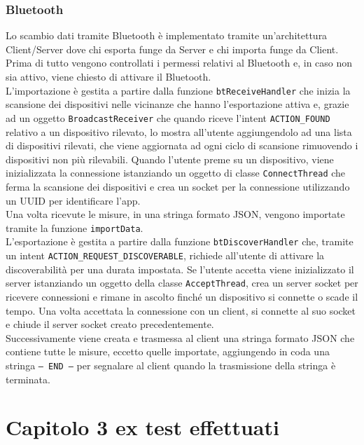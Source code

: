 \documentclass[11pt]{article}
\begin{document}
\subsubsection{Bluetooth}
Lo scambio dati tramite Bluetooth è implementato tramite un'architettura Client/Server dove chi esporta funge da Server e chi importa funge da Client. \\
Prima di tutto vengono controllati i permessi relativi al Bluetooth e, in caso non sia attivo, viene chiesto di attivare il Bluetooth. \\
L'importazione è gestita a partire dalla funzione \texttt{btReceiveHandler} che inizia la scansione dei dispositivi nelle vicinanze che hanno l'esportazione attiva e, grazie ad un oggetto \texttt{BroadcastReceiver} che quando riceve l'intent \texttt{ACTION\_FOUND} relativo a un dispositivo rilevato, lo mostra all'utente aggiungendolo ad una lista di dispositivi rilevati, che viene aggiornata ad ogni ciclo di scansione rimuovendo i dispositivi non più rilevabili. Quando l'utente preme su un dispositivo, viene inizializzata la connessione istanziando un oggetto di classe \texttt{ConnectThread} che ferma la scansione dei dispositivi e crea un socket per la connessione utilizzando un UUID per identificare l'app. \\
Una volta ricevute le misure, in una stringa formato JSON, vengono importate tramite la funzione \texttt{importData}. \\
L'esportazione è gestita a partire dalla funzione \texttt{btDiscoverHandler} che, tramite un intent \texttt{ACTION\_REQUEST\_DISCOVERABLE}, richiede all'utente di attivare la discoverabilità per una durata impostata. Se l'utente accetta viene inizializzato il server istanziando un oggetto della classe \texttt{AcceptThread}, crea un server socket per ricevere connessioni e rimane in ascolto finché un dispositivo si connette o scade il tempo. Una volta accettata la connessione con un client, si connette al suo socket e chiude il server socket creato precedentemente. \\
Successivamente viene creata e trasmessa al client una stringa formato JSON che contiene tutte le misure, eccetto quelle importate, aggiungendo in coda una stringa \texttt{-- END --} per segnalare al client quando la trasmissione della stringa è terminata.

\section{Capitolo 3 ex test effettuati}
\end{document}
